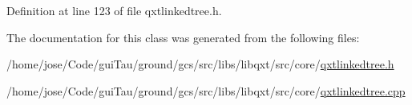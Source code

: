 Definition at line 123 of file qxtlinkedtree.\-h.



The documentation for this class was generated from the following files\-:\begin{DoxyCompactItemize}
\item 
/home/jose/\-Code/gui\-Tau/ground/gcs/src/libs/libqxt/src/core/\hyperlink{qxtlinkedtree_8h}{qxtlinkedtree.\-h}\item 
/home/jose/\-Code/gui\-Tau/ground/gcs/src/libs/libqxt/src/core/\hyperlink{qxtlinkedtree_8cpp}{qxtlinkedtree.\-cpp}\end{DoxyCompactItemize}

